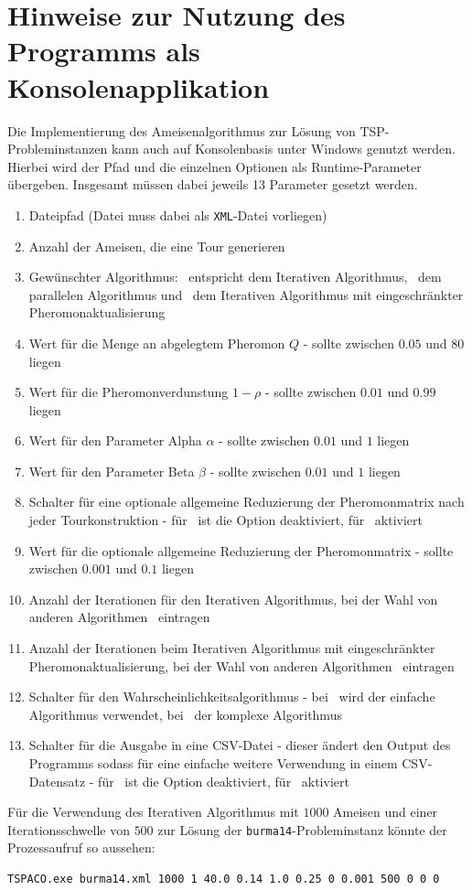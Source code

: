 \documentclass[doktyp=barbeit, sprache=german]{TUBAFarbeiten}
\begin{document}
\section{Hinweise zur Nutzung des Programms als Konsolenapplikation}
Die Implementierung des Ameisenalgorithmus zur Lösung von TSP-Probleminstanzen kann auch auf Konsolenbasis unter Windows genutzt werden. Hierbei wird der Pfad und die einzelnen Optionen als Runtime-Parameter übergeben. Insgesamt müssen dabei jeweils 13 Parameter gesetzt werden.
\begin{enumerate}
\item Dateipfad (Datei muss dabei als \texttt{XML}-Datei vorliegen)
\item Anzahl der Ameisen, die eine Tour generieren
\item Gewünschter Algorithmus: \grqq\, entspricht dem Iterativen Algorithmus, \grqq\, dem parallelen Algorithmus und \grqq\, dem Iterativen Algorithmus mit eingeschränkter Pheromonaktualisierung
\item Wert für die Menge an abgelegtem Pheromon $Q$ - sollte zwischen $0.05$ und $80$ liegen
\item Wert für die Pheromonverdunstung $1 - \rho$ - sollte zwischen $0.01$ und $0.99$ liegen
\item Wert für den Parameter Alpha $\alpha$ - sollte zwischen $0.01$ und $1$ liegen
\item Wert für den Parameter Beta $\beta$ - sollte zwischen $0.01$ und $1$ liegen
\item Schalter für eine optionale allgemeine Reduzierung der Pheromonmatrix nach jeder Tourkonstruktion - für \grqq\, ist die Option deaktiviert, für \grqq\, aktiviert
\item Wert für die optionale allgemeine Reduzierung der Pheromonmatrix - sollte zwischen $0.001$ und $0.1$ liegen
\item Anzahl der Iterationen für den Iterativen Algorithmus, bei der Wahl von anderen Algorithmen \grqq\, eintragen
\item Anzahl der Iterationen beim Iterativen Algorithmus mit eingeschränkter Pheromonaktualisierung, bei der Wahl von anderen Algorithmen \grqq\, eintragen
\item Schalter für den Wahrscheinlichkeitsalgorithmus - bei \grqq\, wird der einfache Algorithmus verwendet, bei \grqq\, der komplexe Algorithmus
\item Schalter für die Ausgabe in eine CSV-Datei - dieser ändert den Output des Programms sodass für eine einfache weitere Verwendung in einem CSV-Datensatz - für \grqq\, ist die Option deaktiviert, für \grqq\, aktiviert
\end{enumerate}
Für die Verwendung des Iterativen Algorithmus mit $1000$ Ameisen und einer Iterationsschwelle von $500$ zur Lösung der \texttt{burma14}-Probleminstanz könnte der Prozessaufruf so aussehen:
\begin{lstlisting}
TSPACO.exe burma14.xml 1000 1 40.0 0.14 1.0 0.25 0 0.001 500 0 0 0
\end{lstlisting}
\newpage
\end{document}
